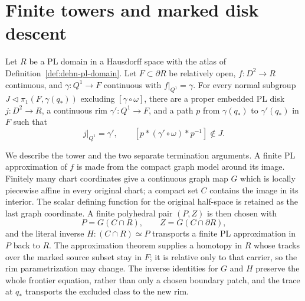 \section{Finite towers and marked disk descent}
\label{sec:dehn-marked-tower}

\begin{theorem}
\label{thm:dehn-marked-loop}
Let $R$ be a PL domain in a Hausdorff space with the atlas of
Definition~\ref{def:dehn-pl-domain}.  Let $F\subset\partial R$ be
relatively open, $f:D^2\to R$ continuous, and $\gamma:Q^1\to F$
continuous with $f|_{Q^1}=\gamma$.  For every normal subgroup
$J\triangleleft\pi_1(F,\gamma(q_*))$ excluding $[\gamma\circ\omega]$,
there are a proper embedded PL disk $j:D^2\to R$, a continuous rim
$\gamma':Q^1\to F$, and a path $p$ from $\gamma(q_*)$ to
$\gamma'(q_*)$ in $F$ such that
\[
 j|_{Q^1}=\gamma',\qquad
 [p*(\gamma'\circ\omega)*p^{-1}]\notin J.
\]
\end{theorem}

We describe the tower and the two separate termination arguments.  A
finite PL approximation of $f$ is made from the compact graph model
around its image.  Finitely many chart coordinates give a continuous
graph map $G$ which is locally piecewise affine in every original chart;
a compact set $C$ contains the image in its interior.  The scalar
defining function for the original half-space is retained as the last
graph coordinate.  A finite polyhedral pair $(P,Z)$ is then chosen with
\[
 P=G(C\cap R),\qquad Z=G(C\cap\partial R),
\]
and the literal inverse $H:(C\cap R)\simeq P$ transports a finite PL
approximation in $P$ back to $R$.  The approximation theorem supplies a
homotopy in $R$ whose tracks over the marked source subset stay in $F$;
it is relative only to that carrier, so the rim parametrization may
change.  The inverse identities for $G$ and $H$ preserve the whole
frontier equation, rather than only a chosen boundary patch, and the
trace at $q_*$ transports the excluded class to the new rim.

